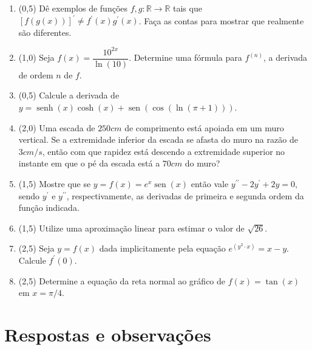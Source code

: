 \documentclass[12pt,a4paper]{article}
\newcommand*\sen{\operatorname{sen}}
\newcommand*\senh{\operatorname{senh}}
\begin{document}
\begin{enumerate}
\item (0,5) Dê exemplos de funções $f, g: \mathbb{R} \to \mathbb{R}$ tais que $\left[f( g(x) )\right]^\prime \neq f^\prime(x)g^\prime(x)$. Faça as contas para mostrar que realmente são diferentes.

\item (1,0) Seja $f(x) = \dfrac{10^{2x}}{\ln(10)}$. Determine uma fórmula para $f^{(n)}$, a derivada de ordem $n$ de $f$.

\item (0,5) Calcule a derivada de $y = \senh(x)\cosh(x) + \sen(\cos(\ln(\pi + 1)))$.

\item (2,0) Uma escada de $250cm$ de comprimento está apoiada em um muro vertical. Se a extremidade inferior da escada se afasta do muro na razão de $3cm/s$, então com que rapidez está descendo a extremidade superior no instante em que o pé da escada está a $70cm$ do muro?

\item (1,5) Mostre que se
$y = f(x) = e^x \sen(x)$
então vale
$y^{\prime \prime} - 2y^\prime +2y = 0$,
sendo $y^\prime$ e $y^{\prime\prime}$, respectivamente, as derivadas de primeira e segunda ordem da função indicada.

\item (1,5) Utilize uma aproximação linear para estimar o valor de $\sqrt{26}$.

\item (2,5) Seja $y=f(x)$ dada implicitamente pela equação $e^{(y^2 \cdot x)}=x-y$. Calcule $f^\prime(0)$.

\item (2,5) Determine a equação da reta normal ao gráfico de $f(x) = \tan(x)$ em $x=\pi/4$.

\end{enumerate}

\newpage
\restoregeometry
\section*{Respostas e observações}
\end{document}
